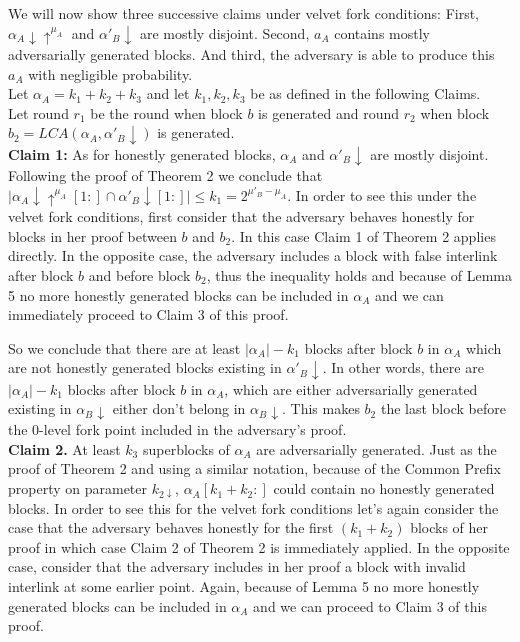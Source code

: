 \documentclass[11pt,a4paper]{article}
\begin{document}
We will now show three successive claims under velvet fork conditions: First, $\alpha_A \downarrow \uparrow^{\mu_A}$ and $\alpha'_B \downarrow$ are mostly disjoint. Second, $a_A$ contains mostly adversarially generated blocks. And third, the adversary is able to produce this $a_A$ with negligible probability.\\
Let $\alpha_A = k_1 + k_2 + k_3$ and let $k_1, k_2, k_3$ be as defined in the following Claims.\\
Let round $r_1$ be the round when block $b$ is generated and round $r_2$ when block $b_2 = LCA(\alpha_A, \alpha'_B\downarrow)$ is generated.\\

\textbf{Claim 1:} As for honestly generated blocks, $\alpha_A$ and $ \alpha'_B\downarrow$ are mostly disjoint. Following the proof of Theorem 2 we conclude that $\vert \alpha_A\downarrow\uparrow^{\mu_A}[1:] \cap \alpha'_B\downarrow[1:] \vert \leq k_{1} = 2^{\mu'_B - \mu_A}$. In order to see this under the velvet fork conditions, first consider that the adversary behaves honestly for blocks in her proof between $b$ and $b_2$. In this case Claim 1 of Theorem 2 applies directly. In the opposite case, the adversary includes a block with false interlink after block $b$ and before block $b_2$, thus the inequality holds and because of Lemma 5 no more honestly generated blocks can be included in $\alpha_A$ and we can immediately proceed to Claim 3 of this proof.

So we conclude that there are at least $\vert \alpha_A \vert - k_1$ blocks after block $b$ in $\alpha_A$ which are not honestly generated blocks existing in $\alpha'_B\downarrow$. In other words, there are $\vert \alpha_A \vert - k_1$ blocks after block $b$ in $\alpha_A$, which are either adversarially generated existing in $\alpha_B\downarrow$ either don't belong in $\alpha_B\downarrow$. This makes $b_2$ the last block before the 0-level fork point included in the adversary's proof.\\

\textbf{Claim 2.} 
At least $k_3$ superblocks of $\alpha_A$ are adversarially generated. Just as the proof of Theorem 2 and using a similar notation, because of the Common Prefix property on parameter $k_{2\downarrow}$, $\alpha_A[k_{1}+k_{2}:]$ could contain no honestly generated blocks. In order to see this for the velvet fork conditions let's again consider the case that the adversary behaves honestly for the first $(k_1 + k_2)$ blocks of her proof in which case Claim 2 of Theorem 2 is immediately applied. In the opposite case, consider that the adversary includes in her proof a block with invalid interlink at some earlier point. Again, because of Lemma 5 no more honestly generated blocks can be included in $\alpha_A$ and we can proceed to Claim 3 of this proof.\\
\end{document}

